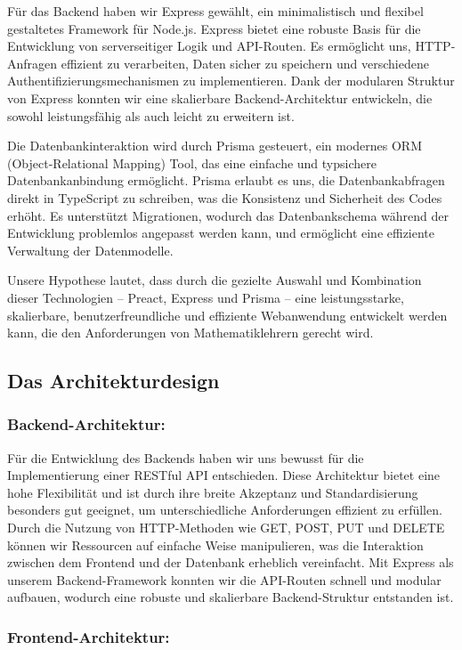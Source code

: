 \documentclass[12pt,a4paper]{article} %
\begin{document}
Für das Backend haben wir Express gewählt, ein minimalistisch und flexibel gestaltetes Framework für Node.js. Express bietet eine robuste Basis für die Entwicklung von serverseitiger Logik und API-Routen. Es ermöglicht uns, HTTP-Anfragen effizient zu verarbeiten, Daten sicher zu speichern und verschiedene Authentifizierungsmechanismen zu implementieren. Dank der modularen Struktur von Express konnten wir eine skalierbare Backend-Architektur entwickeln, die sowohl leistungsfähig als auch leicht zu erweitern ist.

Die Datenbankinteraktion wird durch Prisma gesteuert, ein modernes ORM (Object-Relational Mapping) Tool, das eine einfache und typsichere Datenbankanbindung ermöglicht. Prisma erlaubt es uns, die Datenbankabfragen direkt in TypeScript zu schreiben, was die Konsistenz und Sicherheit des Codes erhöht. Es unterstützt Migrationen, wodurch das Datenbankschema während der Entwicklung problemlos angepasst werden kann, und ermöglicht eine effiziente Verwaltung der Datenmodelle.

Unsere Hypothese lautet, dass durch die gezielte Auswahl und Kombination dieser Technologien – Preact, Express und Prisma – eine leistungsstarke, skalierbare, benutzerfreundliche und effiziente Webanwendung entwickelt werden kann, die den Anforderungen von Mathematiklehrern gerecht wird.

\subsection{Das Architekturdesign}

\subsubsection{Backend-Architektur:} 

Für die Entwicklung des Backends haben wir uns bewusst für die Implementierung einer RESTful API entschieden. Diese Architektur bietet eine hohe Flexibilität und ist durch ihre breite Akzeptanz und Standardisierung besonders gut geeignet, um unterschiedliche Anforderungen effizient zu erfüllen. Durch die Nutzung von HTTP-Methoden wie GET, POST, PUT und DELETE können wir Ressourcen auf einfache Weise manipulieren, was die Interaktion zwischen dem Frontend und der Datenbank erheblich vereinfacht. Mit Express als unserem Backend-Framework konnten wir die API-Routen schnell und modular aufbauen, wodurch eine robuste und skalierbare Backend-Struktur entstanden ist.

\subsubsection{Frontend-Architektur:} 
\end{document}
